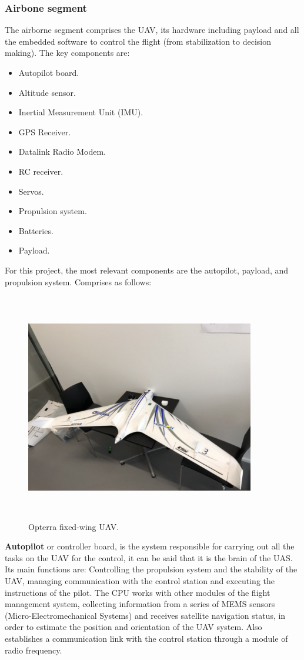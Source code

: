 \subsubsection{Airbone segment}
The airborne segment comprises the UAV, its hardware including payload and all the embedded software to control the flight (from stabilization to decision making). The key components are:
\begin{itemize}
    \item Autopilot board.
    \item Altitude sensor.
    \item Inertial Measurement Unit (IMU).
    \item GPS Receiver.
    \item Datalink Radio Modem.
    \item RC receiver.
    \item Servos.
    \item Propulsion system.
    \item Batteries.
    \item Payload.
\end{itemize}
For this project, the most relevant components are the autopilot, payload, and propulsion system. Comprises as follows:
\begin{figure}[H]
\centering
\includegraphics[width=10cm,height=10cm,keepaspectratio]{imagenes/opterra.jpg}
\caption{Opterra fixed-wing UAV.}
\label{fig:Optera}
\end{figure}
\textbf{ Autopilot} or controller board, is the system responsible for carrying out all the tasks on the UAV for the control, it can be said that it is the brain of the UAS. Its main functions are: Controlling the propulsion system and the stability of the UAV, managing communication with the control station and executing the instructions of the pilot. The CPU works with other modules of the flight management system, collecting information from a series of MEMS sensors (Micro-Electromechanical Systems) and receives satellite navigation status, in order to estimate the position and orientation of the UAV system. Also establishes a communication link with the control station through a module of radio frequency.\cite{Edgar}

